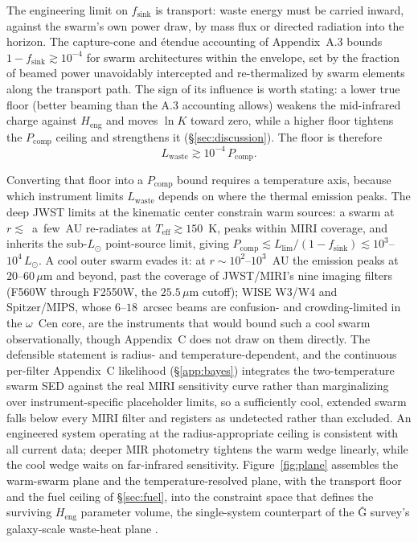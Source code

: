 \documentclass[11pt]{article}
\newcommand{\ocen}{\ensuremath{\omega}~Cen}
\newcommand{\lnK}{\ensuremath{\ln K}}
\newcommand{\Heng}{\ensuremath{H_{\mathrm{eng}}}}
\begin{document}
The engineering limit on $f_{\mathrm{sink}}$ is transport: waste energy must be carried inward, against the swarm's own power draw, by mass flux or directed radiation into the horizon. The capture-cone and \'etendue accounting of Appendix~A.3 bounds $1 - f_{\mathrm{sink}} \gtrsim 10^{-4}$ for swarm architectures within the envelope, set by the fraction of beamed power unavoidably intercepted and re-thermalized by swarm elements along the transport path. The sign of its influence is worth stating: a lower true floor (better beaming than the A.3 accounting allows) weakens the mid-infrared charge against \Heng{} and moves \lnK{} toward zero, while a higher floor tightens the $P_{\mathrm{comp}}$ ceiling and strengthens it (\S\ref{sec:discussion}). The floor is therefore
\begin{equation}
L_{\mathrm{waste}} \gtrsim 10^{-4}\,P_{\mathrm{comp}}.
\end{equation}

Converting that floor into a $P_{\mathrm{comp}}$ bound requires a temperature axis, because which instrument limits $L_{\mathrm{waste}}$ depends on where the thermal emission peaks. The deep JWST limits at the kinematic center \citep{Chen2025JWST} constrain warm sources: a swarm at $r \lesssim$~a~few~AU re-radiates at $T_{\mathrm{eff}} \gtrsim 150$~K, peaks within MIRI coverage, and inherits the sub-$L_{\odot}$ point-source limit, giving $P_{\mathrm{comp}} \lesssim L_{\mathrm{lim}}/(1-f_{\mathrm{sink}}) \lesssim 10^{3}$--$10^{4}\,L_{\odot}$. A cool outer swarm evades it: at $r \sim 10^{2}$--$10^{3}$~AU the emission peaks at $20$--$60\,\mu$m and beyond, past the coverage of JWST/MIRI's nine imaging filters (F560W through F2550W, the $25.5\,\mu$m cutoff); WISE W3/W4 and Spitzer/MIPS, whose $6$--$18$~arcsec beams are confusion- and crowding-limited in the \ocen{} core, are the instruments that would bound such a cool swarm observationally, though Appendix~C does not draw on them directly. The defensible statement is radius- and temperature-dependent, and the continuous per-filter Appendix~C likelihood (\S\ref{app:bayes}) integrates the two-temperature swarm SED against the real MIRI sensitivity curve rather than marginalizing over instrument-specific placeholder limits, so a sufficiently cool, extended swarm falls below every MIRI filter and registers as undetected rather than excluded. An engineered system operating at the radius-appropriate ceiling is consistent with all current data; deeper MIR photometry tightens the warm wedge linearly, while the cool wedge waits on far-infrared sensitivity. Figure~\ref{fig:plane} assembles the warm-swarm plane and the temperature-resolved plane, with the transport floor and the fuel ceiling of \S\ref{sec:fuel}, into the constraint space that defines the surviving \Heng{} parameter volume, the single-system counterpart of the \^G survey's galaxy-scale waste-heat plane \citep{Wright2014,Wright2014b}.
\end{document}
